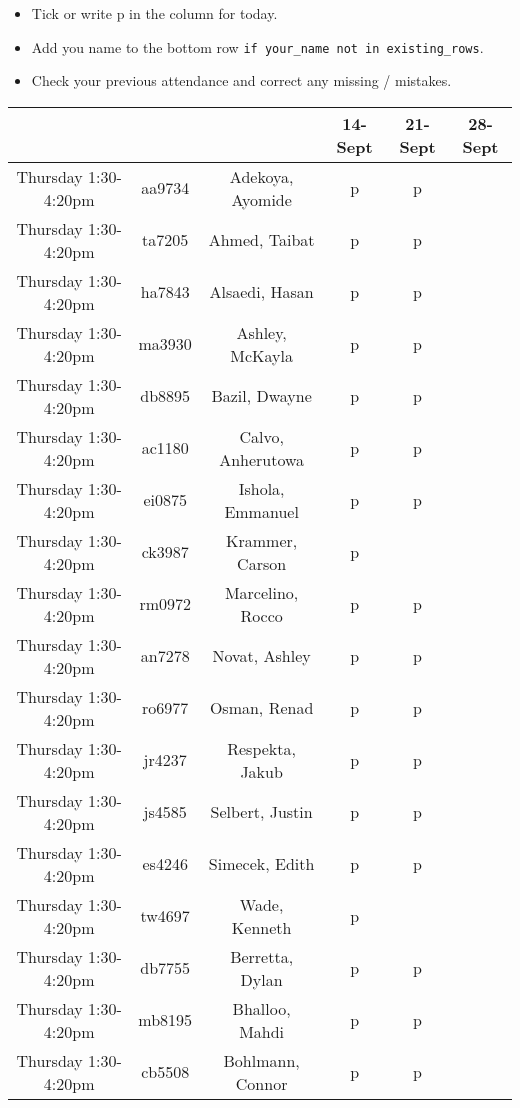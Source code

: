 \documentclass[letterpaper]{article}
\begin{document}
\thispagestyle{empty}

\begin{itemize}
    \item Tick or write p in the column for today.
    \item Add you name to the bottom row \texttt{{\color{blue}if} your\_name {\color{blue}not in} existing\_rows}.
    \item Check your previous attendance and correct any missing / mistakes.
\end{itemize}

\begin{longtable}{|c|c|c|c|c|c|}
\hline
& & & 14-Sept & 21-Sept & 28-Sept \\
\hline
Thursday 1:30-4:20pm & aa9734 & Adekoya, Ayomide & p & p  &  \\
\hline
Thursday 1:30-4:20pm & ta7205 & Ahmed, Taibat & p & p  &  \\
\hline
Thursday 1:30-4:20pm & ha7843 & Alsaedi, Hasan & p & p  &  \\
\hline
Thursday 1:30-4:20pm & ma3930 & Ashley, McKayla & p & p  &  \\
\hline
Thursday 1:30-4:20pm & db8895 & Bazil, Dwayne & p & p  &  \\
\hline
Thursday 1:30-4:20pm & ac1180 & Calvo, Anherutowa & p & p  &  \\
\hline
Thursday 1:30-4:20pm & ei0875 & Ishola, Emmanuel & p & p  &  \\
\hline
Thursday 1:30-4:20pm & ck3987 & Krammer, Carson & p  & & \\
\hline
Thursday 1:30-4:20pm & rm0972 & Marcelino, Rocco & p & p  &  \\
\hline
Thursday 1:30-4:20pm & an7278 & Novat, Ashley & p & p  &  \\
\hline
Thursday 1:30-4:20pm & ro6977 & Osman, Renad & p & p  &  \\
\hline
Thursday 1:30-4:20pm & jr4237 & Respekta, Jakub & p & p  &  \\
\hline
Thursday 1:30-4:20pm & js4585 & Selbert, Justin & p & p  &  \\
\hline
Thursday 1:30-4:20pm & es4246 & Simecek, Edith & p & p  &  \\
\hline
Thursday 1:30-4:20pm & tw4697 & Wade, Kenneth & p  & & \\
\hline
Thursday 1:30-4:20pm & db7755 & Berretta, Dylan & p & p  &  \\
\hline
Thursday 1:30-4:20pm & mb8195 & Bhalloo, Mahdi & p & p  &  \\
\hline
Thursday 1:30-4:20pm & cb5508 & Bohlmann, Connor & p & p  &  \\

\end{longtable}
\end{document}
